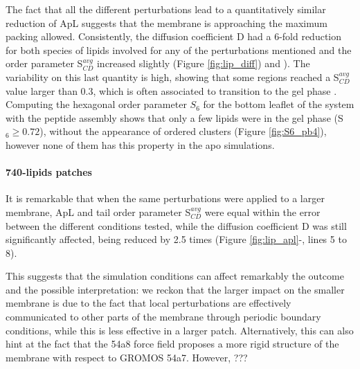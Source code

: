 The fact that all the different perturbations lead to a quantitatively similar reduction of ApL suggests that the membrane is approaching the maximum packing allowed.
%
Consistently, the diffusion coefficient D had a 6-fold reduction for both species of lipids involved for any of the perturbations mentioned and the order parameter S$^{avg}_{CD}$ increased slightly (Figure \ref{fig:lip_diff}) and ). The variability on this last quantity is high, showing that some regions reached a S$^{avg}_{CD}$ value larger than 0.3, which is often associated to transition to the gel phase \cite{Pluhackova2016}.
%
Computing the hexagonal order parameter $S_6$ for the bottom leaflet of the system with the peptide assembly shows that only a few lipids were in the gel phase (S$_6 \ge 0.72$), without the appearance of ordered clusters (Figure \ref{fig:S6_pb4}), however none of them has this property in the apo simulations.

\paragraph{740-lipids patches} It is remarkable that when the same perturbations were applied to a larger membrane, ApL and tail order parameter S$^{avg}_{CD}$ were equal within the error between the different conditions tested, while the diffusion coefficient D was still significantly affected, being reduced by 2.5 times (Figure \ref{fig:lip_apl}-, lines 5 to 8).

This suggests that the simulation conditions can affect remarkably the outcome and the possible interpretation: we reckon that the larger impact on the smaller membrane is due to the fact that local perturbations are effectively communicated to other parts of the membrane through periodic boundary conditions, while this is less effective in a larger patch.
%
Alternatively, this can also hint at the fact that the 54a8 force field proposes a more rigid structure of the membrane with respect to GROMOS 54a7. However, ???


